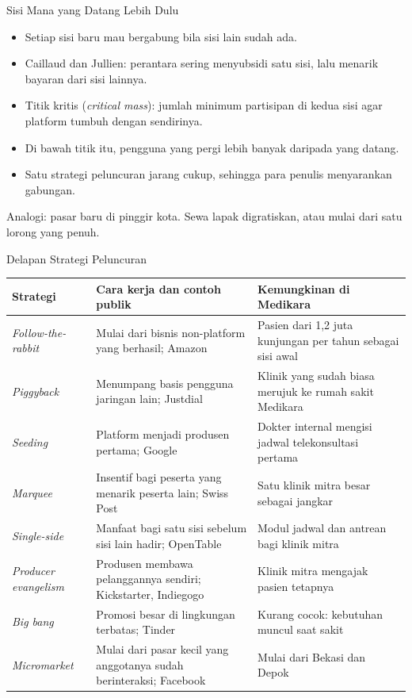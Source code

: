 \documentclass[aspectratio=169, table, 12pt]{beamer}
\begin{document}
\begin{frame}{{\Large Sisi Mana yang Datang Lebih Dulu}}
  \begin{itemize}
    \item Setiap sisi baru mau bergabung bila sisi lain sudah ada.
    \item Caillaud dan Jullien: perantara sering menyubsidi satu sisi, lalu menarik bayaran dari sisi lainnya.
    \item Titik kritis (\textit{critical mass}): jumlah minimum partisipan di kedua sisi agar platform tumbuh dengan sendirinya.
    \item Di bawah titik itu, pengguna yang pergi lebih banyak daripada yang datang.
    \item Satu strategi peluncuran jarang cukup, sehingga para penulis menyarankan gabungan.
  \end{itemize}
  \vspace{2pt}
  {\footnotesize Analogi: pasar baru di pinggir kota. Sewa lapak digratiskan, atau mulai dari satu lorong yang penuh.\par}
\end{frame}

\begin{frame}{{\Large Delapan Strategi Peluncuran}}
  \scriptsize
  \begin{tabularx}{\textwidth}{>{\raggedright\arraybackslash}p{2.6cm}
      >{\raggedright\arraybackslash}X
      >{\raggedright\arraybackslash}X}
    \hline
    \textbf{Strategi} & \textbf{Cara kerja dan contoh publik} & \textbf{Kemungkinan di Medikara} \\ \hline
    \textit{Follow-the-rabbit} & Mulai dari bisnis non-platform yang berhasil; Amazon & Pasien dari 1,2 juta kunjungan per tahun sebagai sisi awal \\ \hline
    \textit{Piggyback} & Menumpang basis pengguna jaringan lain; Justdial & Klinik yang sudah biasa merujuk ke rumah sakit Medikara \\ \hline
    \textit{Seeding} & Platform menjadi produsen pertama; Google & Dokter internal mengisi jadwal telekonsultasi pertama \\ \hline
    \textit{Marquee} & Insentif bagi peserta yang menarik peserta lain; Swiss Post & Satu klinik mitra besar sebagai jangkar \\ \hline
    \textit{Single-side} & Manfaat bagi satu sisi sebelum sisi lain hadir; OpenTable & Modul jadwal dan antrean bagi klinik mitra \\ \hline
    \textit{Producer evangelism} & Produsen membawa pelanggannya sendiri; Kickstarter, Indiegogo & Klinik mitra mengajak pasien tetapnya \\ \hline
    \textit{Big bang} & Promosi besar di lingkungan terbatas; Tinder & Kurang cocok: kebutuhan muncul saat sakit \\ \hline
    \textit{Micromarket} & Mulai dari pasar kecil yang anggotanya sudah berinteraksi; Facebook & Mulai dari Bekasi dan Depok \\ \hline
  \end{tabularx}
\end{frame}
\end{document}
